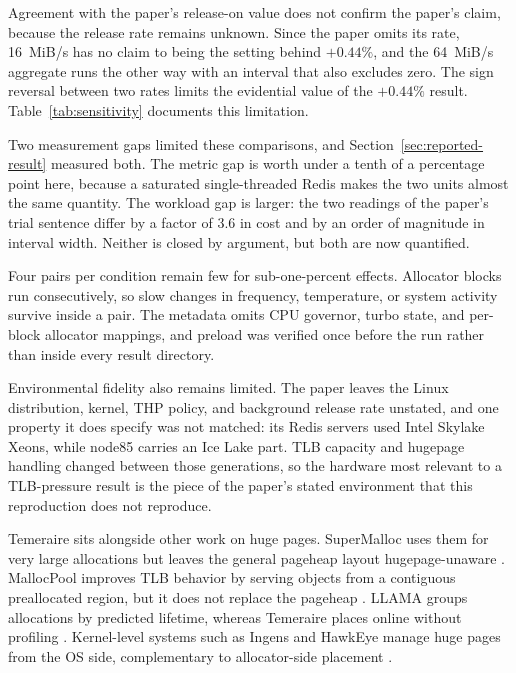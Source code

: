 \documentclass[sigconf]{acmart}
\begin{document}
Agreement with the paper's release-on value does not confirm the paper's claim,
because the release rate remains unknown. Since the paper omits its
rate, 16~MiB/s has no claim to being the setting behind $+0.44\%$, and the
64~MiB/s aggregate runs the other way with an interval that also excludes zero.
The sign reversal between two rates limits the evidential value of the
$+0.44\%$ result. Table~\ref{tab:sensitivity} documents this limitation.

Two measurement gaps limited these comparisons, and Section~\ref{sec:reported-result} measured both. The metric gap is worth under a tenth of a percentage
point here, because a saturated single-threaded Redis makes the two units
almost the same quantity. The workload gap is larger: the two readings of the
paper's trial sentence differ by a factor of 3.6 in cost and by an order of
magnitude in interval width. Neither is closed by argument, but both are now
quantified.

Four pairs per condition remain few for sub-one-percent effects. Allocator
blocks run consecutively, so slow changes in frequency, temperature, or system
activity survive inside a pair. The metadata omits CPU governor, turbo state,
and per-block allocator mappings, and preload was verified once before the run
rather than inside every result directory.

Environmental fidelity also remains limited. The paper leaves the Linux
distribution, kernel, THP policy, and background release rate unstated, and
one property it does specify was not matched: its Redis servers used Intel
Skylake Xeons, while node85 carries an Ice Lake part. TLB capacity and
hugepage handling changed between those generations, so the hardware most
relevant to a TLB-pressure result is the piece of the paper's stated
environment that this reproduction does not reproduce.

Temeraire sits alongside other work on huge pages. SuperMalloc uses them for
very large allocations but leaves the general pageheap layout hugepage-unaware
\cite{10.1145/2754169.2754178}. MallocPool improves TLB behavior by serving
objects from a contiguous preallocated region, but it does not replace the
pageheap \cite{8502619}. LLAMA groups allocations by predicted lifetime,
whereas Temeraire places online without profiling
\cite{10.1145/3373376.3378525}. Kernel-level systems such as Ingens and
HawkEye manage huge pages from the OS side, complementary to allocator-side
placement \cite{10.5555/3026877.3026931,10.1145/3297858.3304064}.
\end{document}
